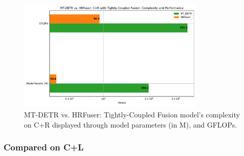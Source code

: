 \documentclass[report.tex]{subfiles}
\begin{document}
    \begin{figure}[h!]
        \centering
        \includegraphics[width=0.8\textwidth]{images/results/hrfuser_vs_mtdetr/cr/model_complexity.pdf}
        \caption{MT-DETR vs. HRFuser: Tightly-Coupled Fusion model's complexity on C+R displayed through model parameters (in M), and GFLOPs.}
        \label{fig:hrfuser_vs_mtdetr_cr_model_complexity}
    \end{figure}

    \FloatBarrier
    \subsubsection{Compared on C+L}
\end{document}
